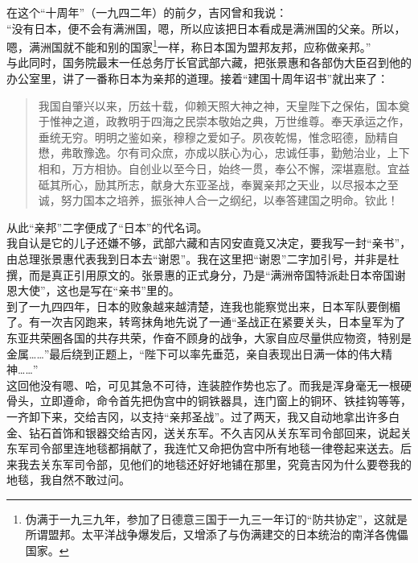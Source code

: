 在这个“十周年”（一九四二年）的前夕，吉冈曾和我说：\\

“没有日本，便不会有满洲国，嗯，所以应该把日本看成是满洲国的父亲。所以，嗯，满洲国就不能和别的国家\footnote{伪满于一九三九年，参加了日德意三国于一九三一年订的“防共协定”，这就是所谓盟邦。太平洋战争爆发后，又增添了与伪满建交的日本统治的南洋各傀儡国家。}一样，称日本国为盟邦友邦，应称做亲邦。”\\

与此同时，国务院最末一任总务厅长官武部六藏，把张景惠和各部伪大臣召到他的办公室里，讲了一番称日本为亲邦的道理。接着“建国十周年诏书”就出来了：\\

\begin{quote}
	我国自肇兴以来，历兹十载，仰赖天照大神之神，天皇陛下之保佑，国本奠于惟神之道，政教明于四海之民崇本敬始之典，万世维尊。奉天承运之作，垂统无穷。明明之鉴如亲，穆穆之爱如子。夙夜乾惕，惟念昭德，励精自懋，弗敢豫逸。尔有司众庶，亦成以朕心为心，忠诚任事，勤勉治业，上下相和，万方相协。自创业以至今日，始终一贯，奉公不懈，深堪嘉慰。宜益砥其所心，励其所志，献身大东亚圣战，奉翼亲邦之天业，以尽报本之至诚，努力国本之培养，振张神人合一之纲纪，以奉答建国之明命。钦此！
\end{quote}

从此“亲邦”二字便成了“日本”的代名词。\\

我自认是它的儿子还嫌不够，武部六藏和吉冈安直竟又决定，要我写一封“亲书”，由总理张景惠代表我到日本去“谢恩”。我在这里把“谢恩”二字加引号，并非是杜撰，而是真正引用原文的。张景惠的正式身分，乃是“满洲帝国特派赴日本帝国谢恩大使”，这也是写在“亲书”里的。\\

到了一九四四年，日本的败象越来越清楚，连我也能察觉出来，日本军队要倒楣了。有一次吉冈跑来，转弯抹角地先说了一通“圣战正在紧要关头，日本皇军为了东亚共荣圈各国的共存共荣，作奋不顾身的战争，大家自应尽量供应物资，特别是金属……”最后绕到正题上，“陛下可以率先垂范，亲自表现出日满一体的伟大精神……”\\

这回他没有嗯、哈，可见其急不可待，连装腔作势也忘了。而我是浑身毫无一根硬骨头，立即遵命，命令首先把伪宫中的铜铁器具，连门窗上的铜环、铁挂钩等等，一齐卸下来，交给吉冈，以支持“亲邦圣战”。过了两天，我又自动地拿出许多白金、钻石首饰和银器交给吉冈，送关东军。不久吉冈从关东军司令部回来，说起关东军司令部里连地毯都捐献了，我连忙又命把伪宫中所有地毯一律卷起来送去。后来我去关东军司令部，见他们的地毯还好好地铺在那里，究竟吉冈为什么要卷我的地毯，我自然不敢过问。\\

